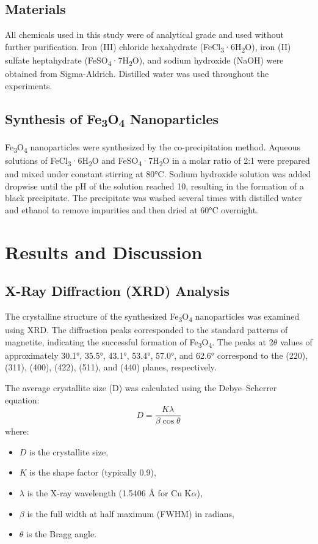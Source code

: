 \documentclass[12pt]{article}
\begin{document}
\subsection{Materials}
All chemicals used in this study were of analytical grade and used without further purification. Iron (III) chloride hexahydrate (FeCl\textsubscript{3}·6H\textsubscript{2}O), iron (II) sulfate heptahydrate (FeSO\textsubscript{4}·7H\textsubscript{2}O), and sodium hydroxide (NaOH) were obtained from Sigma-Aldrich. Distilled water was used throughout the experiments.

\subsection{Synthesis of Fe\textsubscript{3}O\textsubscript{4} Nanoparticles}
Fe\textsubscript{3}O\textsubscript{4} nanoparticles were synthesized by the co-precipitation method. Aqueous solutions of FeCl\textsubscript{3}·6H\textsubscript{2}O and FeSO\textsubscript{4}·7H\textsubscript{2}O in a molar ratio of 2:1 were prepared and mixed under constant stirring at 80°C. Sodium hydroxide solution was added dropwise until the pH of the solution reached 10, resulting in the formation of a black precipitate. The precipitate was washed several times with distilled water and ethanol to remove impurities and then dried at 60°C overnight.

\section{Results and Discussion}

\subsection{X-Ray Diffraction (XRD) Analysis}
The crystalline structure of the synthesized Fe\textsubscript{3}O\textsubscript{4} nanoparticles was examined using XRD. The diffraction peaks corresponded to the standard patterns of magnetite, indicating the successful formation of Fe\textsubscript{3}O\textsubscript{4}. The peaks at 2$\theta$ values of approximately 30.1°, 35.5°, 43.1°, 53.4°, 57.0°, and 62.6° correspond to the (220), (311), (400), (422), (511), and (440) planes, respectively.

The average crystallite size (D) was calculated using the Debye–Scherrer equation:
\[
D = \frac{K\lambda}{\beta \cos \theta}
\]
where:
\begin{itemize}
    \item $D$ is the crystallite size,
    \item $K$ is the shape factor (typically 0.9),
    \item $\lambda$ is the X-ray wavelength (1.5406 Å for Cu K$\alpha$),
    \item $\beta$ is the full width at half maximum (FWHM) in radians,
    \item $\theta$ is the Bragg angle.
\end{itemize}
\end{document}
